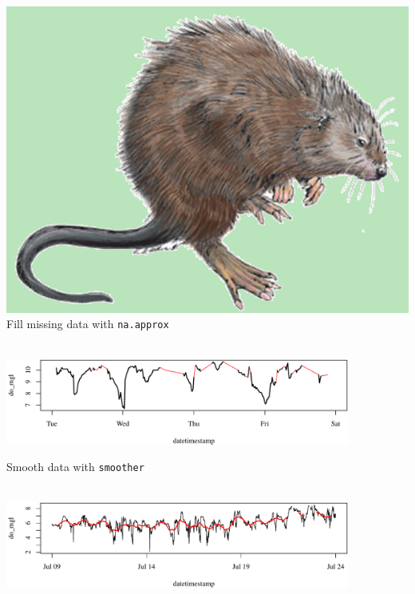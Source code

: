 \documentclass[serif]{beamer}\usepackage[]{graphicx}\usepackage[]{color}
\newenvironment{knitrout}{}{} %
\begin{document}
\begin{frame}[fragile]{\includegraphics[width=0.05\paperwidth]{fig/muskrat.png}\hspace{0.07in}{\bf SWMPrats.net: The SWMPr package}}
Fill missing data with \texttt{na.approx} \\~\\
\begin{knitrout}\scriptsize
{}\color{fgcolor}

{\centering \includegraphics[width=0.85\textwidth]{fig//filled-1} 

}



\end{knitrout}
Smooth data with \texttt{smoother} \\~\\
\begin{knitrout}\scriptsize
{}\color{fgcolor}

{\centering \includegraphics[width=0.85\textwidth]{fig//smooth-1} 

}



\end{knitrout}
\end{frame}
\end{document}
